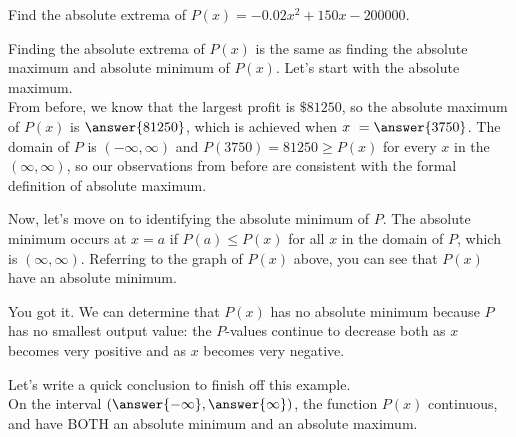 \documentclass{ximera}
\begin{document}
\begin{example}
Find the absolute extrema of $P(x) = -0.02x^2 + 150x-200000$.
\begin{explanation}
Finding the absolute extrema of $P(x)$ is the same as finding the absolute maximum and absolute minimum of $P(x)$.  Let's start with the absolute maximum.  \\

From before, we know that the largest profit is $\$81250$, so the absolute maximum of $P(x)$ is $\answer{81250}$, which is achieved when $x \ = \answer{3750}$.  The domain of $P$ is $(-\infty, \infty)$ and $P(3750) = 81250 \geq P(x)$ for every $x$ in the $(\infty, \infty)$, so our observations from before are consistent with the formal definition of absolute maximum. \\

\begin{explanation}

Now, let's move on to identifying the absolute minimum of $P$.  The absolute minimum occurs at $x=a$ if $P(a) \leq P(x)$ for all $x$ in the domain of $P$, which is $(\infty, \infty)$.  Referring to the graph of $P(x)$ above, you can see that $P(x)$  have an absolute minimum. 

\begin{feedback}[correct]
You got it.  We can determine that $P(x)$ has no absolute minimum because $P$ has no smallest output value: the $P$-values continue to decrease both as $x$ becomes very positive and as $x$ becomes very negative. 
\end{feedback}

\begin{explanation}

Let's write a quick conclusion to finish off this example. \\

On the  interval $\left( \answer{-\infty}, \answer{\infty} \right)$, the function $P(x)$  continuous, and  have BOTH an absolute minimum and an absolute maximum.  

\end{explanation}

\end{explanation}

\end{explanation}

\end{example}
\end{document}
